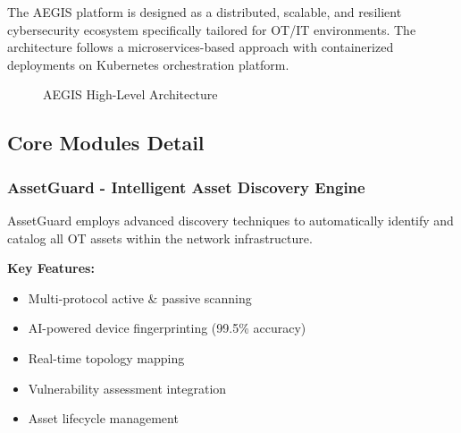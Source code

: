 \documentclass[12pt,a4paper]{article}
\begin{document}
The AEGIS platform is designed as a distributed, scalable, and resilient cybersecurity ecosystem specifically tailored for OT/IT environments. The architecture follows a microservices-based approach with containerized deployments on Kubernetes orchestration platform.

\begin{figure}[H]
\centering
{}
\caption{AEGIS High-Level Architecture}
\end{figure}

\subsection{Core Modules Detail}

\subsubsection{AssetGuard - Intelligent Asset Discovery Engine}

AssetGuard employs advanced discovery techniques to automatically identify and catalog all OT assets within the network infrastructure.

\textbf{Key Features:}
\begin{itemize}
    \item Multi-protocol active \& passive scanning
    \item AI-powered device fingerprinting (99.5\% accuracy)
    \item Real-time topology mapping
    \item Vulnerability assessment integration
    \item Asset lifecycle management
\end{itemize}
\end{document}
